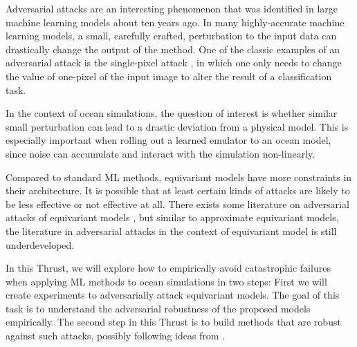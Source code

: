 \documentclass[11pt]{article}
\renewcommand{\paragraph}[1]{\medskip\par\noindent\textbf{#1~---}}
\begin{document}
Adversarial attacks are an interesting phenomenon that was identified in large machine learning models \cite{goodfellow2014explaining} about ten years ago. In many  highly-accurate machine learning models, a small, carefully crafted,  perturbation to the input data can drastically change the output of the method. One of the classic examples of an adversarial attack is the single-pixel attack \cite{su2019one}, in which one only needs to change the value of one-pixel of the input image to alter the result of a classification task.

In the context of ocean simulations, the question of interest is whether similar small perturbation can lead to a drastic deviation from a physical model. This is especially important when rolling out a learned emulator to an ocean model, since noise can accumulate and interact with the simulation non-linearly.


Compared to standard ML methods, equivariant models have more constraints in their architecture. It is possible that at least certain kinds of attacks are likely to be less effective or not effective at all.  There exists some literature on adversarial attacks of equivariant models \cite{schuchardt2023provable}, but similar to approximate equivariant models, the literature in adversarial attacks in the context of equivariant model is still underdeveloped. 

In this Thrust, we will explore how to empirically avoid catastrophic failures when applying ML methods to ocean simulations in two steps: First we will create experiments to adversarially attack equivariant models. The goal of this task is to understand the adversarial robustness of the proposed models empirically. The second step in this Thrust is to build methods that are robust against such attacks, possibly following ideas from \cite{schuchardt2023provable}.


\end{document}
